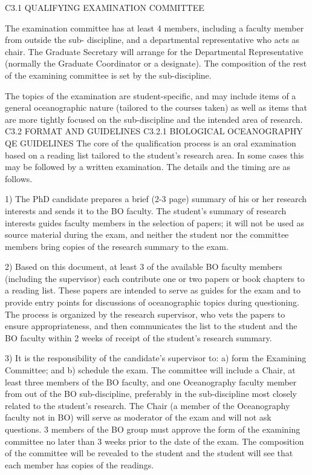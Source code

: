 C3.1	QUALIFYING EXAMINATION COMMITTEE

The examination committee has at least 4 members, including a faculty member from outside the sub- discipline, and a departmental representative who acts as chair. The Graduate Secretary will arrange for the Departmental Representative (normally the Graduate Coordinator or a designate). The composition of the rest of the examining committee is set by the sub-discipline.

The topics of the examination are student-specific, and may include items of a general oceanographic nature (tailored to the courses taken) as well as items that are more tightly focused on the sub-discipline and the intended area of research.
C3.2	FORMAT AND GUIDELINES
C3.2.1  BIOLOGICAL OCEANOGRAPHY QE GUIDELINES
The core of the qualification process is an oral examination based on a reading list tailored to the student’s research area. In some cases this may be followed by a written examination. The details and the timing are as follows.

1)	The PhD candidate prepares a brief (2-3 page) summary of his or her research interests and sends it to the BO faculty. The student’s summary of research interests guides faculty members in the selection of papers; it will not be used as source material during the exam, and neither the student nor the committee members bring copies of the research summary to the exam.

2)	Based on this document, at least 3 of the available BO faculty members (including the supervisor) each contribute one or two papers or book chapters to a reading list. These papers are intended to serve as guides for the exam and to provide entry points for discussions of oceanographic topics during questioning. The process is organized by the research supervisor, who vets the papers to ensure appropriateness, and then communicates the list to the student and the BO faculty within 2 weeks of receipt of the student’s research summary.

3)	It is the responsibility of the candidate’s supervisor to: a) form the Examining Committee; and b) schedule the exam. The committee will include a Chair, at least three members of the BO faculty, and one Oceanography faculty member from out of the BO sub-discipline, preferably in the sub-discipline most closely related to the student’s research. The Chair (a member of the Oceanography faculty not in BO) will serve as moderator of the exam and will not ask questions. 3 members of the BO group must approve the form of the examining committee no later than 3 weeks prior to the date of the exam. The composition of the committee will be revealed to the student and the student will see that each member has copies of the readings.


